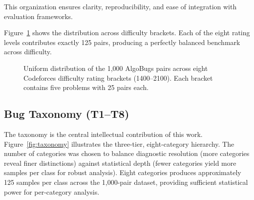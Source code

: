 This organization ensures clarity, reproducibility, and ease of integration with evaluation frameworks.

Figure~\ref{fig:rating_dist} shows the distribution across difficulty brackets. Each of the eight rating levels contributes exactly 125 pairs, producing a perfectly balanced benchmark across difficulty.

\begin{figure}[h!]
\centering
{}
\caption{Uniform distribution of the 1,000 AlgoBugs pairs across eight Codeforces difficulty rating brackets (1400--2100). Each bracket contains five problems with 25 pairs each.}
\label{fig:rating_dist}
\end{figure}

\subsection{Bug Taxonomy (T1--T8)}

The taxonomy is the central intellectual contribution of this work. Figure~\ref{fig:taxonomy} illustrates the three-tier, eight-category hierarchy. The number of categories was chosen to balance diagnostic resolution (more categories reveal finer distinctions) against statistical depth (fewer categories yield more samples per class for robust analysis). Eight categories produces approximately 125 samples per class across the 1,000-pair dataset, providing sufficient statistical power for per-category analysis.

